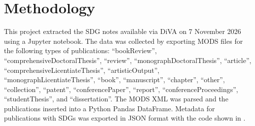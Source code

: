 \section{Methodology}
\label{sec:Methodology}
This project extracted the \gls{SDG} notes available via \gls{DiVA} on 7 November 2026 using a Jupyter notebook. The data was collected by exporting \gls{MODS} files for the following types of publications: \enquote{bookReview}, \enquote{comprehensiveDoctoralThesis}, \enquote{review}, \enquote{monographDoctoralThesis}, \enquote{article}, \enquote{comprehensiveLicentiateThesis}, \enquote{artisticOutput}, \enquote{monographLicentiateThesis}, \enquote{book}, \enquote{manuscript}, \enquote{chapter}, \enquote{other}, \enquote{collection}, \enquote{patent}, \enquote{conferencePaper}, \enquote{report}, \enquote{conferenceProceedings}, \enquote{studentThesis}, and \enquote{dissertation}. The \gls{MODS} \gls{XML} was parsed and the publications inserted into a Python Pandas DataFrame. Metadata for publications with \glspl{SDG} was exported in \gls{JSON} format with the code shown in .

